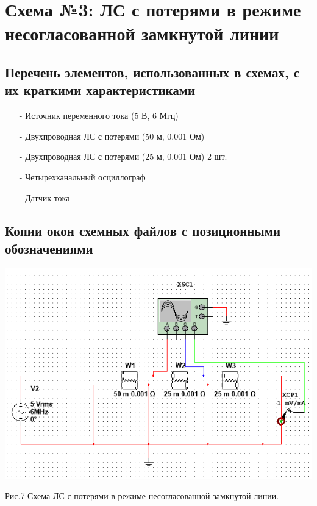 \documentclass[11pt]{article}
\begin{document}
\section{ Схема №3: ЛС с потерями в режиме несогласованной замкнутой линии}
\subsection{Перечень элементов, использованных в схемах, с
их краткими характеристиками}
\begin{itemize}    
    \item[-] Источник переменного тока (5 В, 6 Мгц)
    \item[-] Двухпроводная ЛС с потерями (50 м, 0.001 Ом)
    \item[-] Двухпроводная ЛС с потерями (25 м, 0.001 Ом) 2 шт.
    \item[-] Четырехканальный осциллограф
    \item[-] Датчик тока
\end{itemize}

\subsection{Копии окон схемных файлов с позиционными обозначениями}
\includegraphics[width=1\linewidth]{img/third.png}
\begin{center}
    Рис.7 Схема ЛС с потерями в режиме несогласованной замкнутой линии.
\end{center}
\end{document}
